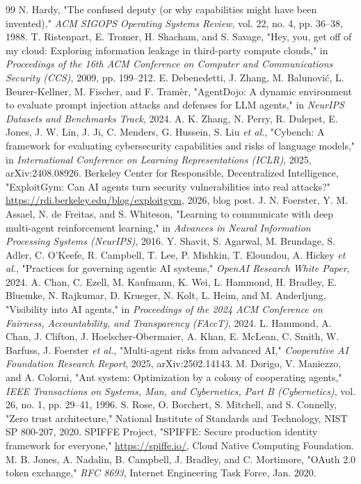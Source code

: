 \documentclass[conference]{IEEEtran}
\begin{document}
\begin{thebibliography}{99}
 N. Hardy, "The confused deputy (or why capabilities might have been invented)," \textit{ACM SIGOPS Operating Systems Review}, vol. 22, no. 4, pp. 36--38, 1988.
 T. Ristenpart, E. Tromer, H. Shacham, and S. Savage, "Hey, you, get off of my cloud: Exploring information leakage in third-party compute clouds," in \textit{Proceedings of the 16th ACM Conference on Computer and Communications Security (CCS)}, 2009, pp. 199--212.
 E. Debenedetti, J. Zhang, M. Balunović, L. Beurer-Kellner, M. Fischer, and F. Tramèr, "AgentDojo: A dynamic environment to evaluate prompt injection attacks and defenses for LLM agents," in \textit{NeurIPS Datasets and Benchmarks Track}, 2024.
 A. K. Zhang, N. Perry, R. Dulepet, E. Jones, J. W. Lin, J. Ji, C. Menders, G. Hussein, S. Liu \textit{et al.}, "Cybench: A framework for evaluating cybersecurity capabilities and risks of language models," in \textit{International Conference on Learning Representations (ICLR)}, 2025, arXiv:2408.08926.
 Berkeley Center for Responsible, Decentralized Intelligence, "ExploitGym: Can AI agents turn security vulnerabilities into real attacks?" \url{https://rdi.berkeley.edu/blog/exploitgym}, 2026, blog post.
 J. N. Foerster, Y. M. Assael, N. de Freitas, and S. Whiteson, "Learning to communicate with deep multi-agent reinforcement learning," in \textit{Advances in Neural Information Processing Systems (NeurIPS)}, 2016.
 Y. Shavit, S. Agarwal, M. Brundage, S. Adler, C. O'Keefe, R. Campbell, T. Lee, P. Mishkin, T. Eloundou, A. Hickey \textit{et al.}, "Practices for governing agentic AI systems," \textit{OpenAI Research White Paper}, 2024.
 A. Chan, C. Ezell, M. Kaufmann, K. Wei, L. Hammond, H. Bradley, E. Bluemke, N. Rajkumar, D. Krueger, N. Kolt, L. Heim, and M. Anderljung, "Visibility into AI agents," in \textit{Proceedings of the 2024 ACM Conference on Fairness, Accountability, and Transparency (FAccT)}, 2024.
 L. Hammond, A. Chan, J. Clifton, J. Hoelscher-Obermaier, A. Khan, E. McLean, C. Smith, W. Barfuss, J. Foerster \textit{et al.}, "Multi-agent risks from advanced AI," \textit{Cooperative AI Foundation Research Report}, 2025, arXiv:2502.14143.
 M. Dorigo, V. Maniezzo, and A. Colorni, "Ant system: Optimization by a colony of cooperating agents," \textit{IEEE Transactions on Systems, Man, and Cybernetics, Part B (Cybernetics)}, vol. 26, no. 1, pp. 29--41, 1996.
 S. Rose, O. Borchert, S. Mitchell, and S. Connelly, "Zero trust architecture," National Institute of Standards and Technology, NIST SP 800-207, 2020.
 SPIFFE Project, "SPIFFE: Secure production identity framework for everyone," \url{https://spiffe.io/}, Cloud Native Computing Foundation.
 M. B. Jones, A. Nadalin, B. Campbell, J. Bradley, and C. Mortimore, "OAuth 2.0 token exchange," \textit{RFC 8693}, Internet Engineering Task Force, Jan. 2020.
\end{thebibliography}
\end{document}
